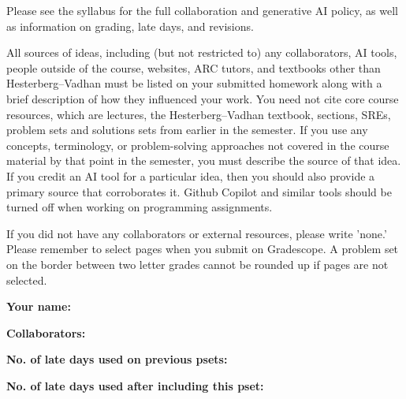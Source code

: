 \documentclass[11pt]{article}
\begin{document}

Please see the syllabus for the full collaboration and generative AI policy, as well as information on grading, late days, and revisions.

All sources of ideas, including (but not restricted to) any collaborators, AI tools, people outside of the course, websites, ARC tutors, and textbooks other than Hesterberg--Vadhan must be listed on your submitted homework along with a brief description of how they influenced your work. You need not cite core course resources, which are lectures, the Hesterberg--Vadhan textbook, sections, SREs, problem sets and solutions sets from earlier in the semester. If you use any concepts, terminology, or problem-solving approaches not covered in the course material by that point in the semester, you must describe the source of that idea. If you credit an AI tool for a particular idea, then you should also provide a primary source that corroborates it. Github Copilot and similar tools should be turned off when working on programming assignments.

If you did not have any collaborators or external resources, please write 'none.' Please remember to select pages when you submit on Gradescope. A problem set on the border between two letter grades cannot be rounded up if pages are not selected. 

\vspace{1em}

\textbf{Your name: }

\textbf{Collaborators: }

\textbf{No. of late days used on previous psets: }

\textbf{No. of late days used after including this pset: }
\end{document}
